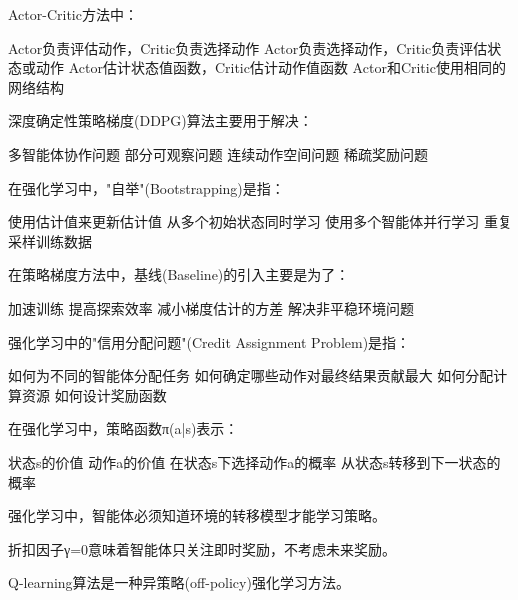 \documentclass[zihao=5,answers]{BHCexam}
\begin{document}
\begin{questions}
\question Actor-Critic方法中：
\begin{choices}
    \choice Actor负责评估动作，Critic负责选择动作
    \CorrectChoice Actor负责选择动作，Critic负责评估状态或动作
    \choice Actor估计状态值函数，Critic估计动作值函数
    \choice Actor和Critic使用相同的网络结构
\end{choices}

\question 深度确定性策略梯度(DDPG)算法主要用于解决：
\begin{choices}
    \choice 多智能体协作问题
    \choice 部分可观察问题
    \CorrectChoice 连续动作空间问题
    \choice 稀疏奖励问题
\end{choices}

\question 在强化学习中，"自举"(Bootstrapping)是指：
\begin{choices}
    \CorrectChoice 使用估计值来更新估计值
    \choice 从多个初始状态同时学习
    \choice 使用多个智能体并行学习
    \choice 重复采样训练数据
\end{choices}

\question 在策略梯度方法中，基线(Baseline)的引入主要是为了：
\begin{choices}
    \choice 加速训练
    \choice 提高探索效率
    \CorrectChoice 减小梯度估计的方差
    \choice 解决非平稳环境问题
\end{choices}

\question 强化学习中的"信用分配问题"(Credit Assignment Problem)是指：
\begin{choices}
    \choice 如何为不同的智能体分配任务
    \CorrectChoice 如何确定哪些动作对最终结果贡献最大
    \choice 如何分配计算资源
    \choice 如何设计奖励函数
\end{choices}

\question 在强化学习中，策略函数π(a|s)表示：
\begin{choices}
    \choice 状态s的价值
    \choice 动作a的价值
    \CorrectChoice 在状态s下选择动作a的概率
    \choice 从状态s转移到下一状态的概率
\end{choices}

\panduan

\question 强化学习中，智能体必须知道环境的转移模型才能学习策略。

\question 折扣因子γ=0意味着智能体只关注即时奖励，不考虑未来奖励。

\question Q-learning算法是一种异策略(off-policy)强化学习方法。


\end{questions}
\end{document}
